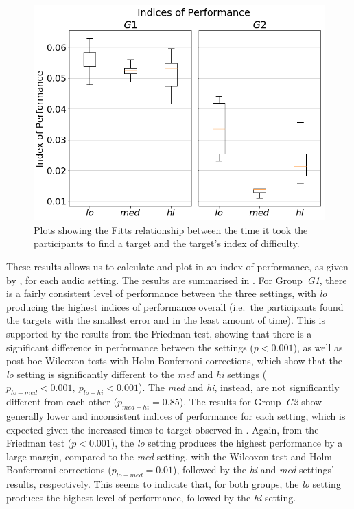 \documentclass[]{interact}
\begin{document}
\begin{figure}[t]
  \centering
  \includegraphics[width=1.0\textwidth]{figures/fitts_ips.png}
  \caption{Plots showing the Fitts relationship between the time it took the participants to find a target and the target's index of difficulty. }\label{fig:fitts-ips}
\end{figure}

These results allows us to calculate and plot in  an index of performance, as given by , for each audio setting.
The results are summarised in .
For Group~\textit{G1}, there is a fairly consistent level of performance between the three settings, with \textit{lo} producing the highest indices of performance overall (i.e.\ the participants found the targets with the smallest error and in the least amount of time).
This is supported by the results from the Friedman test, showing that there is a significant difference in performance between the settings ($p < 0.001$), as well as post-hoc Wilcoxon tests with Holm-Bonferroni corrections, which show that the \textit{lo} setting is significantly different to the \textit{med} and \textit{hi} settings ($p_{lo-med} < 0.001,~p_{lo-hi} < 0.001$). The \textit{med} and \textit{hi}, instead, are not significantly different from each other ($p_{med-hi} = 0.85$).
The results for Group~\textit{G2} show generally lower and inconsistent indices of performance for each setting, which is expected given the increased times to target observed in .
Again, from the Friedman test ($p < 0.001$), the \textit{lo} setting produces the highest performance by a large margin, compared to the \textit{med} setting, with the Wilcoxon test and Holm-Bonferronni corrections ($p_{lo-med}=0.01$), followed by the \textit{hi} and \textit{med} settings' results, respectively.
This seems to indicate that, for both groups, the \textit{lo} setting produces the highest level of performance, followed by the \textit{hi} setting.
\end{document}
